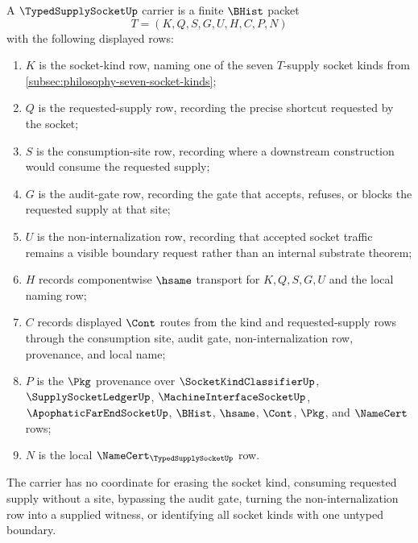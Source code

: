 \begin{definition}
\label{def:typed-supply-socket-carrier}
A $\TypedSupplySocketUp$ carrier is a finite $\BHist$ packet
$$
T=(K,Q,S,G,U,H,C,P,N)
$$
with the following displayed rows:
\begin{enumerate}
\item $K$ is the socket-kind row, naming one of the seven $T$-supply socket kinds from \autoref{subsec:philosophy-seven-socket-kinds};
\item $Q$ is the requested-supply row, recording the precise shortcut requested by the socket;
\item $S$ is the consumption-site row, recording where a downstream construction would consume the requested supply;
\item $G$ is the audit-gate row, recording the gate that accepts, refuses, or blocks the requested supply at that site;
\item $U$ is the non-internalization row, recording that accepted socket traffic remains a visible boundary request rather than an internal substrate theorem;
\item $H$ records componentwise $\hsame$ transport for $K,Q,S,G,U$ and the local naming row;
\item $C$ records displayed $\Cont$ routes from the kind and requested-supply rows through the consumption site, audit gate, non-internalization row, provenance, and local name;
\item $P$ is the $\Pkg$ provenance over $\SocketKindClassifierUp$, $\SupplySocketLedgerUp$, $\MachineInterfaceSocketUp$, $\ApophaticFarEndSocketUp$, $\BHist$, $\hsame$, $\Cont$, $\Pkg$, and $\NameCert$ rows;
\item $N$ is the local $\NameCert_{\TypedSupplySocketUp}$ row.
\end{enumerate}
The carrier has no coordinate for erasing the socket kind, consuming requested supply without a site, bypassing the audit gate, turning the non-internalization row into a supplied witness, or identifying all socket kinds with one untyped boundary.
\end{definition}

